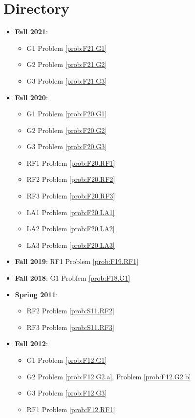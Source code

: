\documentclass{article}
\theoremstyle{definition}
\begin{document}
\tableofcontents

\section{Directory}

\begin{itemize}
\item \textbf{Fall 2021}:
	\begin{itemize}
	\item G1 Problem \ref{prob:F21.G1} 
	\item G2 Problem \ref{prob:F21.G2}
	\item G3 Problem \ref{prob:F21.G3}
	\end{itemize}

\item \textbf{Fall 2020}:
	\begin{itemize}
	\item G1 Problem \ref{prob:F20.G1} 
	\item G2 Problem \ref{prob:F20.G2}
	\item G3 Problem \ref{prob:F20.G3}
	\item RF1 Problem \ref{prob:F20.RF1}
	\item RF2 Problem \ref{prob:F20.RF2}
	\item RF3 Problem \ref{prob:F20.RF3}
	\item LA1 Problem \ref{prob:F20.LA1}
	\item LA2 Problem \ref{prob:F20.LA2}
	\item LA3 Problem \ref{prob:F20.LA3}	
	\end{itemize}
\item \textbf{Fall 2019}: RF1 Problem \ref{prob:F19.RF1}
\item \textbf{Fall 2018}: G1 Problem \ref{prob:F18.G1}
\item \textbf{Spring 2011}:
	\begin{itemize}
		\item RF2 Problem \ref{prob:S11.RF2}
		\item RF3 Problem \ref{prob:S11.RF3}
	\end{itemize}
\item \textbf{Fall 2012}:	
	\begin{itemize}
	\item G1 Problem \ref{prob:F12.G1} 
	\item G2 Problem \ref{prob:F12.G2.a}, Problem \ref{prob:F12.G2.b}
	\item G3 Problem \ref{prob:F12.G3}
	\item RF1 Problem \ref{prob:F12.RF1}

\end{itemize}
\end{itemize}
\end{document}
